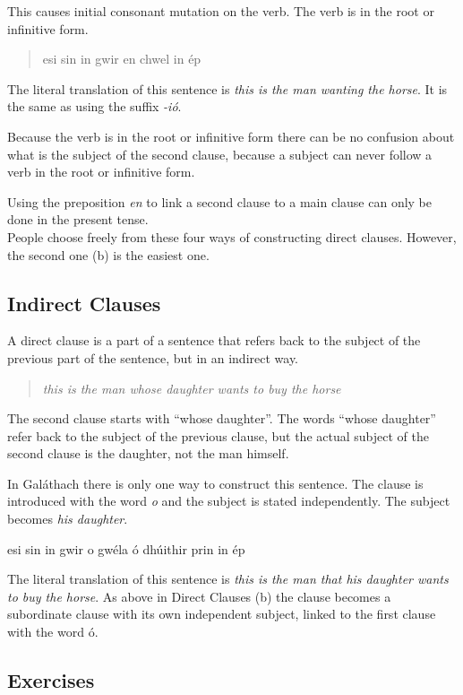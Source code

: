 This causes initial consonant mutation on the verb. The verb is in the root or infinitive form.


\begin{quote}
esi sin in gwir en chwel in \'{e}p
\end{quote}

The literal translation of this sentence is \textit{this is the man wanting the horse}. It is the same as using the suffix \textit{-i\'{o}}.

Because the verb is in the root or infinitive form there can be no confusion about what is the subject of the second clause, because a subject can never follow a verb in the root or infinitive form.

Using the preposition \textit{en} to link a second clause to a main clause can only be done in the present tense.\\
People choose freely from these four ways of constructing direct clauses. However, the second one (b) is the easiest one.

\subsection{Indirect Clauses}

A direct clause is a part of a sentence that refers back to the subject of the previous part of the sentence, but in an indirect way.

\begin{quote}
  \textit{this is the man whose daughter wants to buy the horse}
\end{quote}

The second clause starts with ``whose daughter''. The words ``whose daughter'' refer back to the subject of the previous clause, but the actual subject of the second clause is the daughter, not the man himself.

In Gal\'{a}thach there is only one way to construct this sentence. The clause is introduced with the word \textit{o} and the subject is stated independently. The subject becomes \textit{his daughter}.

esi sin in gwir o gw\'{e}la \'{o} dh\'{u}ithir prin in \'{e}p

The literal translation of this sentence is \textit{this is the man that his daughter wants to buy the horse}. As above in Direct Clauses (b) the clause becomes a subordinate clause with its own independent subject, linked to the first clause with the word \'{o}.

\newpage
\subsection{Exercises}

